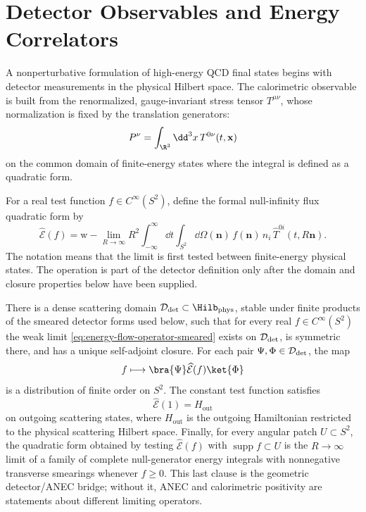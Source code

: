 \section{Detector Observables and Energy Correlators}

A nonperturbative formulation of high-energy QCD final states begins with
detector measurements in the physical Hilbert space.  The calorimetric
observable is built from the renormalized, gauge-invariant stress tensor
\(T^{\mu\nu}\), whose normalization is fixed by the translation generators:
\[
  P^\nu=\int_{\R^3}\dd^3x\,T^{0\nu}(t,\mathbf x)
\]
on the common domain of finite-energy states where the integral is defined as
a quadratic form.

\begin{construction}
\label{cons:qcd-energy-flow-detector}
For a real test function \(f\in C^\infty(S^2)\), define the formal
null-infinity flux quadratic form by
\begin{equation}
  \widehat{\mathcal E}(f)
  =
  \mathrm{w}\!-\!\lim_{R\to\infty}
  R^2
  \int_{-\infty}^{\infty}\dd t
  \int_{S^2}\dd\Omega(\mathbf n)\,
  f(\mathbf n)\,
  n_i\,\widehat T^{0i}(t,R\mathbf n).
  \label{eq:energy-flow-operator-smeared}
\end{equation}
The notation means that the limit is first tested between finite-energy
physical states.  The operation is part of the detector definition only after
the domain and closure properties below have been supplied.
\end{construction}

\begin{hypothesis}
\label{hyp:qcd-energy-flow-detector}
There is a dense scattering domain
\(\mathcal D_{\rm det}\subset\Hilb_{\rm phys}\), stable under finite products
of the smeared detector forms used below, such that for every real
\(f\in C^\infty(S^2)\) the weak limit
\eqref{eq:energy-flow-operator-smeared} exists on
\(\mathcal D_{\rm det}\), is symmetric there, and has a unique self-adjoint
closure.  For each pair \(\Psi,\Phi\in\mathcal D_{\rm det}\), the map
\[
  f\longmapsto
  \bra{\Psi}\widehat{\mathcal E}(f)\ket{\Phi}
\]
is a distribution of finite order on \(S^2\).  The constant test function
satisfies
\[
  \widehat{\mathcal E}(1)=H_{\mathrm{out}}
\]
on outgoing scattering states, where \(H_{\mathrm{out}}\) is the outgoing
Hamiltonian restricted to the physical scattering Hilbert space.  Finally,
for every angular patch \(U\subset S^2\), the quadratic form obtained by
testing \(\widehat{\mathcal E}(f)\) with \(\operatorname{supp}f\subset U\)
is the \(R\to\infty\) limit of a family of complete null-generator energy
integrals with nonnegative transverse smearings whenever \(f\ge0\).  This
last clause is the geometric detector/ANEC bridge; without it, ANEC and
calorimetric positivity are statements about different limiting operators.
\end{hypothesis}

